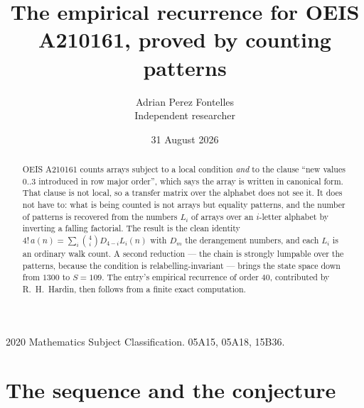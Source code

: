 \documentclass[11pt,a4paper]{article}
\title{The empirical recurrence for OEIS A210161, proved by counting patterns}
\author{Adrian Perez Fontelles\\ \small Independent researcher}
\date{31 August 2026}
\theoremstyle{plain}
\theoremstyle{definition}
\begin{document}
\maketitle

\begin{abstract}
OEIS A210161 counts arrays subject to a local condition \emph{and} to the clause ``new values
$0..3$ introduced in row major order'', which says the array is written in canonical
form. That clause is not local, so a transfer matrix over the alphabet does not see it. It
does not have to: what is being counted is not arrays but equality patterns, and the number
of patterns is recovered from the numbers $L_i$ of arrays over an $i$-letter alphabet by
inverting a falling factorial. The result is the clean identity
$4!\,a(n)=\sum_i\binom{4}{i}D_{4-i}L_i(n)$ with $D_m$ the derangement numbers,
and each $L_i$ is an ordinary walk count. A second reduction --- the chain is strongly
lumpable over the patterns, because the condition is relabelling-invariant --- brings the
state space down from $1300$ to $S=109$. The entry's empirical recurrence of order
$40$, contributed by R.~H.~Hardin, then follows from a finite exact computation.
\end{abstract}

\noindent\small 2020 Mathematics Subject Classification. 05A15, 05A18, 15B36.\normalsize

\section{The sequence and the conjecture}
\end{document}
